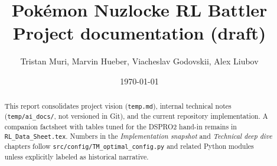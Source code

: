 \documentclass[11pt,a4paper]{report}
\title{Pok\'{e}mon Nuzlocke RL Battler\\[0.3em]
\large Project documentation (draft)}
\author{Tristan Muri, Marvin Hueber, Viacheslav Godovskii, Alex Liubov}
\date{\today}
\begin{document}
\maketitle

\begin{abstract}
This report consolidates project vision (\texttt{temp.md}), internal technical notes (\texttt{temp/ai\_docs/}, not versioned in Git), and the current repository implementation. A companion factsheet with tables tuned for the DSPRO2 hand-in remains in \texttt{RL\_Data\_Sheet.tex}. Numbers in the \emph{Implementation snapshot} and \emph{Technical deep dive} chapters follow \texttt{src/config/TM\_optimal\_config.py} and related Python modules unless explicitly labeled as historical narrative.
\end{abstract}

\tableofcontents
\newpage












\end{document}
